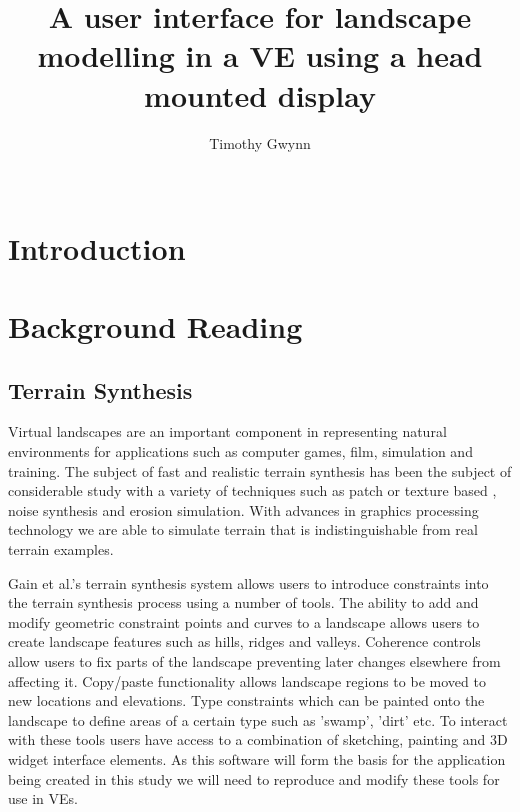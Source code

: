 \documentclass{sig-alternate-05-2015}
\begin{document}
\title{A user interface for landscape modelling in a VE using a head mounted display}

\author{
\alignauthor
Timothy Gwynn\\
       \\
}
\maketitle
\begin{CCSXML}

\end{CCSXML}



\printccsdesc
{}
\begin{abstract}
	
\end{abstract}
\section{Introduction}
\section{Background Reading}
\subsection{Terrain Synthesis} 
Virtual landscapes are an important component in representing natural environments for applications such as computer games, film, simulation and training\cite{Gain2015}. The subject of fast and realistic terrain synthesis has been the subject of considerable study with a variety of techniques such as patch or texture based \cite{Cruz2015, Tasse2012}, noise synthesis\cite{Musgrave1989} and erosion simulation\cite{Anh2007}. With advances in graphics processing technology we are able to simulate terrain that is indistinguishable from real terrain examples\cite{Gain2015}. 

 Gain et al.'s terrain synthesis system allows users to introduce constraints into the terrain synthesis process using a number of tools\cite{Gain2015}. The ability to add and modify geometric constraint points and curves to a landscape allows users to create landscape features such as hills, ridges and valleys.  Coherence controls allow users to fix parts of the landscape preventing later changes elsewhere from affecting it. Copy/paste functionality allows landscape regions to be moved to new locations and elevations. Type constraints which can be painted onto the landscape to define areas of a certain type such as 'swamp', 'dirt' etc. To interact with these tools users have access to a combination of sketching, painting and 3D widget interface elements. As this software will form the basis for the application being created in this study we will need to reproduce and modify these tools for use in VEs.
\end{document}
